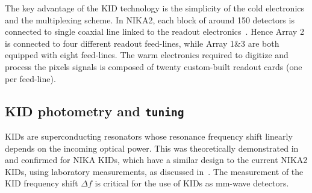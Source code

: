 
The key advantage of the KID technology is the simplicity of the cold
electronics and the multiplexing scheme. In NIKA2, each block of around 150
detectors is connected to single coaxial line linked to the readout
electronics~\citep{Bourrion2016}. {\lp Hence Array 2 is connected to four
different readout feed-lines, while Array 1$\&$3 are both equipped with eight
feed-lines.}
The warm electronics required to digitize
and process the pixels signals is composed of twenty custom-built readout
cards (one per feed-line).

\subsection{KID photometry and {\tt tuning}}
\label{se:tuning}

KIDs are superconducting resonators whose resonance
frequency shift linearly depends on the incoming optical power.
{\lp This was theoretically demonstrated in~\citet{Swenson2010} and
confirmed for NIKA KIDs, which have a similar design to the current
NIKA2 KIDs, using laboratory measurements, as discussed
in~\citet{Monfardini2014JLTP}.}
The measurement of the KID frequency shift $\Delta f$ is critical for the use of
KIDs as mm-wave detectors. 


